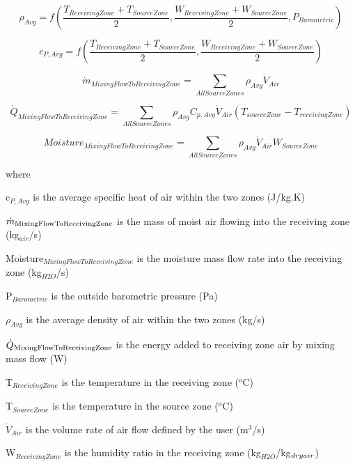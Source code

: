 \begin{equation}
\rho_{Avg} = f \left( \frac{T_{ReceivingZone} + T_{SourceZone}}{2},\frac{W_{ReceivingZone} + W_{SourceZone}}{2},P_{Barometric} \right)
\end{equation}

\begin{equation}
c_{P,Avg} = f \left( \frac{T_{ReceivingZone} + T_{SourceZone}}{2},\frac{W_{ReceivingZone} + W_{SourceZone}}{2} \right)
\end{equation}
    
\begin{equation}
\dot m_{MixingFlowToReceivingZone} = \sum_{AllSourceZones} \rho_{Avg}\dot V_{Air}
\end{equation}

\begin{equation}
\dot Q_{MixingFlowToReceivingZone} = \sum_{AllSourceZones} \rho_{Avg}C_{p,Avg}\dot V_{Air} (T_{sourceZone}-T_{receivingZone})
\end{equation}

\begin{equation}
{Moisture}_{MixingFlowToReceivingZone} = \sum_{AllSourceZones} \rho_{Avg} \dot V_{Air} W_{SourceZone}
\end{equation}

where

c\(_{P,Avg}\) is the average specific heat of air within the two zones (J/kg.K)

\({\dot m_{{\rm{MixingFlowToReceivingZone}}}}\) is the mass of moist air flowing into the receiving zone (kg\(_{air}\)/s)

Moisture\(_{MixingFlowToReceivingZone}\) is the moisture mass flow rate into the receiving zone (kg\(_{H2O}\)/s)

P\(_{Barometric}\) is the outside barometric pressure (Pa)

\(\rho_{Avg}\) is the average density of air within the two zones (kg/s)

\({\dot Q_{{\rm{MixingFlowToReceivingZone}}}}\) is the energy added to receiving zone air by mixing mass flow (W)

T\(_{ReceivingZone}\) is the temperature in the receiving zone (\(^{o}\)C)

T\(_{SourceZone}\) is the temperature in the source zone (\(^{o}\)C)

\({\dot V_{Air}}\) is the volume rate of air flow defined by the user (m\(^{3}\)/s)

W\(_{ReceivingZone}\) is the humidity ratio in the receiving zone (kg\(_{H2O}\)/kg\(_{dry\\ air}\))

